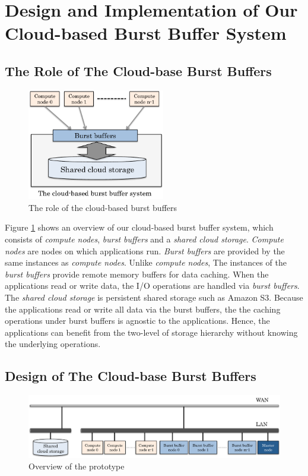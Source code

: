 \section{Design and Implementation of Our Cloud-based Burst Buffer System}
\label{sec:implementation}

\subsection{The Role of The Cloud-base Burst Buffers}
\begin{figure}[tb]
	\centering
	\includegraphics[width=6cm]{img/architecture_overview-2}
	\caption{The role of the cloud-based burst buffers}
	\label{architecture:overview}
\end{figure}

Figure \ref{architecture:overview} shows an overview of our cloud-based
burst buffer system, which consists of \emph{compute nodes}, \emph{burst
buffers} and a \emph{shared cloud storage}. \emph{Compute nodes} are nodes on which
applications run. \emph{Burst buffers} are provided by the same instances
as \emph{compute nodes}. Unlike \emph{compute nodes}, The instances
of the \emph{burst buffers} provide remote memory buffers for data caching.
When the applications read or write data, the I/O operations are handled via
\emph{burst buffers}.  The \emph{shared cloud storage} is persistent shared
storage such as Amazon S3.
Because the applications read or write all data via the burst buffers, the
the caching operations under burst buffers is agnostic to the applications.
Hence, the applications can benefit from the two-level of storage hierarchy
without knowing the underlying operations.

\subsection{Design of The Cloud-base Burst Buffers}
\begin{figure}
\centering
\includegraphics[width=16cm]{img/prototype_overview-2}
\caption{Overview of the prototype}
\label{implemetation:overview of prototype}
\end{figure}

